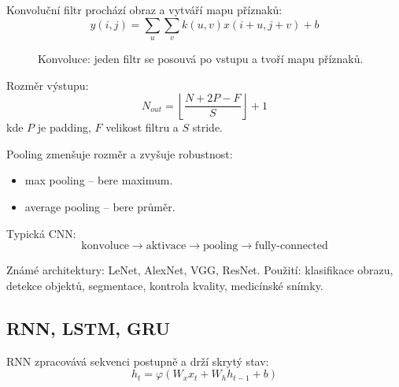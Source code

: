 Konvoluční filtr prochází obraz a vytváří mapu příznaků:
\begin{equation}
    y(i,j)=\sum_u\sum_v k(u,v)x(i+u,j+v)+b
\end{equation}

\begin{figure}[H]
    \centering
    \caption{Konvoluce: jeden filtr se posouvá po vstupu a tvoří mapu příznaků.}
\end{figure}

Rozměr výstupu:
\begin{equation}
    N_{out}=\left\lfloor\frac{N+2P-F}{S}\right\rfloor+1
\end{equation}
kde \(P\) je padding, \(F\) velikost filtru a \(S\) stride.

Pooling zmenšuje rozměr a zvyšuje robustnost:
\begin{itemize}
    \item max pooling -- bere maximum.
    \item average pooling -- bere průměr.
\end{itemize}

Typická CNN:
\begin{equation}
    \text{konvoluce} \rightarrow \text{aktivace} \rightarrow \text{pooling} \rightarrow \text{fully-connected}
\end{equation}

Známé architektury: LeNet, AlexNet, VGG, ResNet. Použití: klasifikace obrazu,
detekce objektů, segmentace, kontrola kvality, medicínské snímky.

\subsection*{RNN, LSTM, GRU}
RNN zpracovává sekvenci postupně a drží skrytý stav:
\begin{equation}
    h_t=\varphi(W_xx_t+W_hh_{t-1}+b)
\end{equation}


